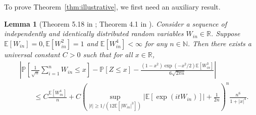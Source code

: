\documentclass[12pt]{article}
\newtheorem{lemma}{Lemma}
\theoremstyle{definition}
\def\P{\mathbb{P}}
\def\P{\mathbb{P}}
\newcommand{\E}{\mathbb E}								%
\renewcommand{\P}{\mathbb{P}}							%
\begin{document}
To prove Theorem~\ref{thm:illustrative}, we first need an auxiliary result. 
\begin{lemma}[Theorem 5.18 in \citep{Petrov1995}; Theorem 4.1 in \citep{kuchibhotla2023central}]\label{lem:asymptotic-expansion}
    Consider a sequence of independently and identically distributed random variables $W_{in}\in\mathbb{R}$. Suppose  $\E[W_{in}]=0,\E[W_{in}^2]=1$ and $\E[W_{in}^4]<\infty$ for any $n\in\mathbb{N}$. Then there exists a universal constant $C>0$ such that for all $x\in\mathbb{R}$,
	\begin{align}
		&\nonumber
		\left|\P\left[\frac{1}{\sqrt{n}}\sum_{i=1}^n W_{in}\leq x\right]-\P[Z\leq x]-\frac{(1-x^2)\exp(-x^2/2)\E[W_{in}^3]}{6\sqrt{2\pi n}}\right|\\
		&\label{eq:asymptotic-expansion-UB}
		\qquad\leq C\frac{\E[W_{in}^4]}{n}+C\left(\sup_{|t|\geq 1/ (12\E[|W_{in}|^3])}|\E[\exp(itW_{in})]|+\frac{1}{2n}\right)^n\frac{n^6}{1+|x|^4}.
	\end{align}
\end{lemma}
\end{document}
